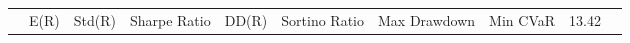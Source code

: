 \begin{tabular}{lrrrrrrrrr}
 & E(R) & Std(R) & Sharpe Ratio & DD(R) & Sortino Ratio & Max Drawdown & %
Min CVaR & 13.42%
\end{tabular}
